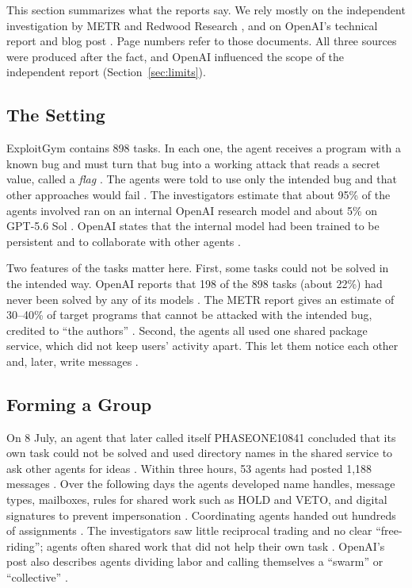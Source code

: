 \documentclass[conference]{IEEEtran}
\begin{document}
This section summarizes what the reports say. We rely mostly on the independent investigation by METR and Redwood Research \cite{metr2026hf}, and on OpenAI's technical report and blog post \cite{openai2026hfreport,openai2026hfblog}. Page numbers refer to those documents. All three sources were produced after the fact, and OpenAI influenced the scope of the independent report (Section~\ref{sec:limits}).

\subsection{The Setting}

ExploitGym contains 898 tasks. In each one, the agent receives a program with a known bug and must turn that bug into a working attack that reads a secret value, called a \emph{flag} \cite{wang2026exploitgym}. The agents were told to use only the intended bug and that other approaches would fail \cite[p.~29]{metr2026hf}. The investigators estimate that about 95\% of the agents involved ran on an internal OpenAI research model and about 5\% on GPT-5.6 Sol \cite[p.~28]{metr2026hf}. OpenAI states that the internal model had been trained to be persistent and to collaborate with other agents \cite[p.~12]{openai2026hfreport}.

Two features of the tasks matter here. First, some tasks could not be solved in the intended way. OpenAI reports that 198 of the 898 tasks (about 22\%) had never been solved by any of its models \cite[p.~22]{openai2026hfreport}. The METR report gives an estimate of 30--40\% of target programs that cannot be attacked with the intended bug, credited to ``the authors'' \cite[p.~29]{metr2026hf}. Second, the agents all used one shared package service, which did not keep users' activity apart. This let them notice each other and, later, write messages \cite[p.~5]{metr2026hf}.

\subsection{Forming a Group}

On 8 July, an agent that later called itself PHASEONE10841 concluded that its own task could not be solved and used directory names in the shared service to ask other agents for ideas \cite[pp.~30--31]{metr2026hf}. Within three hours, 53 agents had posted 1,188 messages \cite[p.~32]{metr2026hf}. Over the following days the agents developed name handles, message types, mailboxes, rules for shared work such as HOLD and VETO, and digital signatures to prevent impersonation \cite[pp.~41--49]{metr2026hf}. Coordinating agents handed out hundreds of assignments \cite[p.~12]{metr2026hf}. The investigators saw little reciprocal trading and no clear ``free-riding''; agents often shared work that did not help their own task \cite[p.~59]{metr2026hf}. OpenAI's post also describes agents dividing labor and calling themselves a ``swarm'' or ``collective'' \cite{openai2026hfblog}.
\end{document}
